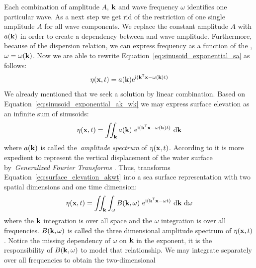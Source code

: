 Each combination of amplitude $A$, \wavevector $\mathbf{k}$ and wave frequency
$\omega$ identifies one particular wave. As a next step we get rid of the
restriction of one single amplitude $A$ for all wave components. We replace the
constant amplitude $A$ with $a(\mathbf{k})$ in order to create a dependency
between \wavevector and wave amplitude. Furthermore, because of the dispersion
relation, we can express frequency as a function of the \wavevector, $\omega =
\omega(\mathbf{k})$. Now we are able to rewrite
Equation~\ref{eq:sinusoid_exponential_sa} as follows:
\begin{equation}
\label{eq:sinusoid_exponential_ak_wk}
\eta(\mathbf{x}, t) =
a(\mathbf{k})\mathrm{e}^{\mathrm{i}(\mathbf{k}^{\mathsf{T}}\mathbf{x}-
\omega(\mathbf{k})t)}
\end{equation}
%
We already mentioned that we seek a solution by linear combination. Based on
Equation~\ref{eq:sinusoid_exponential_ak_wk} we may express surface
elevation as an infinite sum of sinusoids:
\begin{equation}
\label{eq:surface_elevation_akwt}
 \eta(\mathbf{x}, t) = \iint_{\mathbf{k}}
a(\mathbf{k})~\mathrm{e}^{\mathrm{i}(\mathbf{k}^{\mathsf{T}}\mathbf{x}-
\omega(\mathbf{k})t)}~\mathrm{d}\mathbf{k}
\end{equation}
where $a(\mathbf{k})$ is called the~\emph{amplitude spectrum} of
$\eta(\mathbf{x}, t)$.
According to \citet{book:kinsman2002wind} it is more expedient to
represent the vertical displacement of the water surface by~\emph{Generalized
Fourier Transforms} \citep{book:lighthill1958}.
Thus, \citeauthor{book:kinsman2002wind} transforms Equation~\ref{eq:surface_elevation_akwt}
into a sea surface representation with two spatial dimensions and one time dimension:
%
\begin{equation}
\label{eq:surface_elevation_bkwt}
 \eta(\mathbf{x}, t) = \iint_{\mathbf{k}}\int_{\omega} B(\mathbf{k},
\omega)~\mathrm{e}^{\mathrm{i}(\mathbf{k}^{\mathsf{T}}\mathbf{x}-
\omega t)}~
\mathrm{d}\mathbf{k}~\mathrm{d}\omega
\end{equation}
where the $\mathbf{k}$ integration is over all \wavenumber space and the $\omega$
integration is over all frequencies. $B(\mathbf{k},\omega)$ is called the
three dimensional amplitude spectrum of $\eta(\mathbf{x}, t)$. Notice the missing
dependency of $\omega$ on $\mathbf{k}$ in the exponent, it is the responsibility
of $B(\mathbf{k},\omega)$ to model that relationship.
We may integrate separately over all frequencies to obtain the two-dimensional
